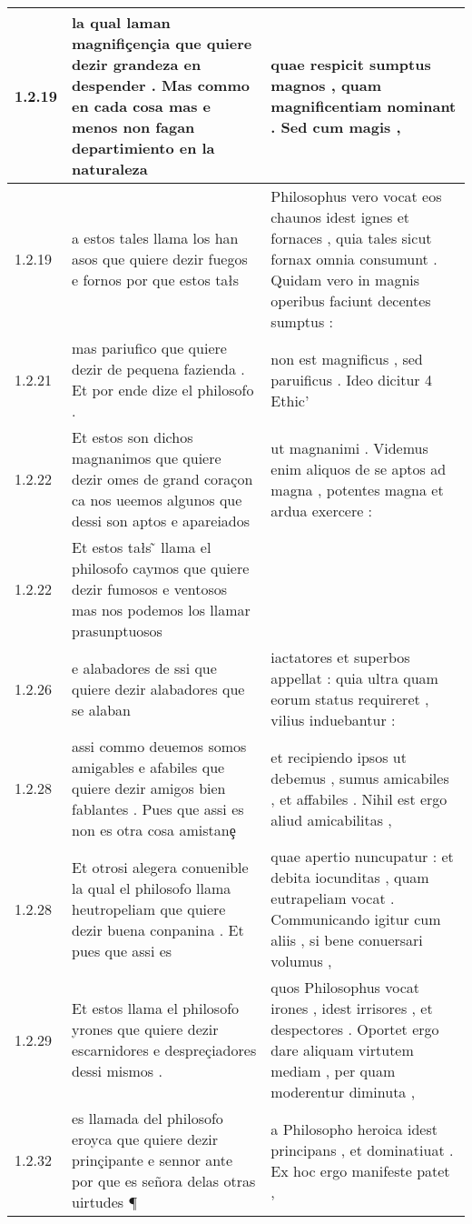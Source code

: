 \begin{tabular}{|p{1cm}|p{6.5cm}|p{6.5cm}|}
1.2.19 & la qual laman magnifiçençia que quiere dezir grandeza en despender . Mas commo en cada cosa mas e menos non fagan departimiento en la naturaleza & quae respicit sumptus magnos , quam magnificentiam nominant . Sed cum magis , \\\hline
1.2.19 & a estos tales llama los han asos que quiere dezir fuegos e fornos por que estos tałs & Philosophus vero vocat eos chaunos idest ignes et fornaces , quia tales sicut fornax omnia consumunt . Quidam vero in magnis operibus faciunt decentes sumptus : \\\hline
1.2.21 & mas pariufico que quiere dezir de pequena fazienda . Et por ende dize el philosofo . & non est magnificus , sed paruificus . Ideo dicitur 4 Ethic’ \\\hline
1.2.22 & Et estos son dichos magnanimos que quiere dezir omes de grand coraçon ca nos ueemos algunos que dessi son aptos e apareiados & ut magnanimi . Videmus enim aliquos de se aptos ad magna , potentes magna et ardua exercere : \\\hline
1.2.22 & Et estos tałs ̃ llama el philosofo caymos que quiere dezir fumosos e ventosos mas nos podemos los llamar prasunptuosos &  \\\hline
1.2.26 & e alabadores de ssi que quiere dezir alabadores que se alaban & iactatores et superbos appellat : quia ultra quam eorum status requireret , vilius induebantur : \\\hline
1.2.28 & assi commo deuemos somos amigables e afabiles que quiere dezir amigos bien fablantes . Pues que assi es non es otra cosa amistanȩ & et recipiendo ipsos ut debemus , sumus amicabiles , et affabiles . Nihil est ergo aliud amicabilitas , \\\hline
1.2.28 & Et otrosi alegera conuenible la qual el philosofo llama heutropeliam que quiere dezir buena conpanina . Et pues que assi es & quae apertio nuncupatur : et debita iocunditas , quam eutrapeliam vocat . Communicando igitur cum aliis , si bene conuersari volumus , \\\hline
1.2.29 & Et estos llama el philosofo yrones que quiere dezir escarnidores e despreçiadores dessi mismos . & quos Philosophus vocat irones , idest irrisores , et despectores . Oportet ergo dare aliquam virtutem mediam , per quam moderentur diminuta , \\\hline
1.2.32 & es llamada del philosofo eroyca que quiere dezir prinçipante e sennor ante por que es señora delas otras uirtudes ¶ & a Philosopho heroica idest principans , et dominatiuat . Ex hoc ergo manifeste patet , \\\hline

\end{tabular}
